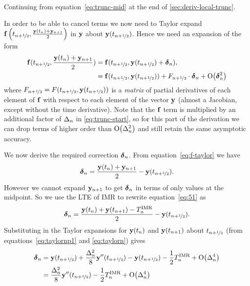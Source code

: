 Continuing from equation~\eqref{eq:trunc-mid} at the end of \cref{sec:deriv-local-trunc}.

In order to be able to cancel terms we now need to Taylor expand ${\mathbf{f}}\left( t_{n+\nicefrac{1}{2}}, \frac{\mathbf{y}(t_n) + \mathbf{y}_{n+1}}{2} \right)$ in $\mathbf{y}$ about $\mathbf{y}(t_{n+\nicefrac{1}{2}})$.
Hence we need an expansion of the form
\begin{equation}
  \begin{aligned}
    \fv(\thf, \frac{\yv(t_n) + \yv_{n+1}}{2}) &= \fv(\thf, \yvhf + \dyn), \\
    &= \fv(\thf, \yvhf) + \dfdyhf \cdot \dyn  + \order{\dyn^2}
    \label{eq:f-taylor}
  \end{aligned}
\end{equation}
where $F_{n+\nicefrac{1}{2}} = F(t_{n+\nicefrac{1}{2}}, \mathbf{y}(t_{n+\nicefrac{1}{2}}))$ is a \emph{matrix} of partial derivatives of each element of ${\mathbf{f}}$ with respect to each element of the vector $\mathbf{y}$ (\ie almost a Jacobian, except without the time derivative).
Note that the ${\mathbf{f}}$ term is multiplied by an additional factor of $\Delta_{n}$ in \eqref{eq:trunc-start}, so for this part of the derivation we can drop terms of higher order than $\text{O}{\left( \Delta_{n}^2 \right)}$ and still retain the same asymptotic accuracy.

We now derive the required correction $\mbox{\boldmath$\delta$}_{n}$.
From equation~\eqref{eq:f-taylor} we have
\begin{equation}
  \dyn = \frac{\yv(t_n) + \yv_{n+1}}{2} - \yvhf.
  \label{eq:51}
\end{equation}
However we cannot expand $\mathbf{y}_{n+1}$ to get $\mbox{\boldmath$\delta$}_{n}$ in terms of only values at the midpoint.
So we use the LTE of IMR to rewrite equation~\eqref{eq:51} as
\begin{equation}
  \mbox{\boldmath$\delta$}_{n} = \frac{\mathbf{y}(t_n) + \mathbf{y}(t_{n+1}) - T_n^{\text{IMR}}}{2} - \mathbf{y}(t_{n+\nicefrac{1}{2}}).
\end{equation}
Substituting in the Taylor expansions for $\mathbf{y}(t_n)$ and $\mathbf{y}(t_{n+1})$ about $t_{n+\nicefrac{1}{2}}$ (from equations~\eqref{eq:taylornp1} and \eqref{eq:taylorn}) gives
\begin{equation}
  \begin{aligned}
    \dyn &= \yvhf + \frac{\dtn^2}{8} \yvhf[''] - \yvhf - \frac{1}{2} \lte^\imr + \order{\dtn^4}\\
    &= \frac{\dtn^2}{8} \yvhf[''] - \frac{1}{2} \lte^\imr + \order{\dtn^4}
    \label{eq:dy-value}
  \end{aligned}
\end{equation}


